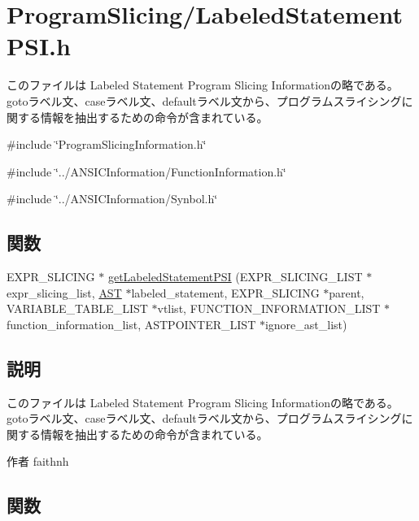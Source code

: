 \section{ProgramSlicing/LabeledStatementPSI.h}
\label{LabeledStatementPSI_8h}


このファイルは Labeled Statement Program Slicing Informationの略である。 gotoラベル文、caseラベル文、defaultラベル文から、プログラムスライシングに関する情報を抽出するための命令が含まれている。  


{\ttfamily \#include \char`\"{}ProgramSlicingInformation.h\char`\"{}}\par
{\ttfamily \#include \char`\"{}../ANSICInformation/FunctionInformation.h\char`\"{}}\par
{\ttfamily \#include \char`\"{}../ANSICInformation/Synbol.h\char`\"{}}\par
\subsection*{関数}
\begin{DoxyCompactItemize}
\item 
EXPR\_\-SLICING $\ast$ \hyperlink{LabeledStatementPSI_8h_ae85b248acedfd5344483f8757a39aa7a}{getLabeledStatementPSI} (EXPR\_\-SLICING\_\-LIST $\ast$expr\_\-slicing\_\-list, \hyperlink{structabstract__syntax__tree}{AST} $\ast$labeled\_\-statement, EXPR\_\-SLICING $\ast$parent, VARIABLE\_\-TABLE\_\-LIST $\ast$vtlist, FUNCTION\_\-INFORMATION\_\-LIST $\ast$function\_\-information\_\-list, ASTPOINTER\_\-LIST $\ast$ignore\_\-ast\_\-list)
\end{DoxyCompactItemize}


\subsection{説明}
このファイルは Labeled Statement Program Slicing Informationの略である。 gotoラベル文、caseラベル文、defaultラベル文から、プログラムスライシングに関する情報を抽出するための命令が含まれている。 \begin{DoxyAuthor}{作者}
faithnh 
\end{DoxyAuthor}


\subsection{関数}
